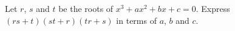 Let \(r\), \(s\) and \(t\) be the roots of \(x^3+ax^2+bx+c=0\). Express \((rs+t)(st+r)(tr+s)\) in terms of \(a\), \(b\) and \(c\).
